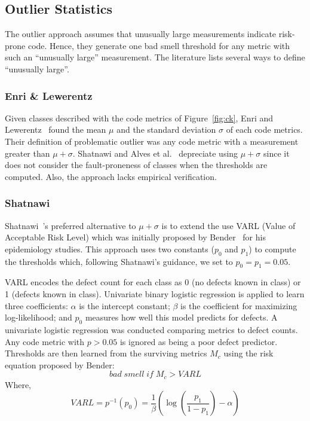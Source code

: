 \documentclass[twocolumn,5p]{elsarticle}
\newcommand{\fig}[1]{Figure~\ref{fig:#1}}
\theoremstyle{break}
\begin{document}
	\subsection{Outlier Statistics}
	
	The outlier approach assumes that unusually large measurements indicate 
	risk-prone code.
	Hence, they generate one bad smell threshold for any metric
	with such an ``unusually large'' measurement.
	The literature lists several ways to define ``unusually large''.
	
	
	
	
	\subsubsection{Enri \& Lewerentz}
	Given classes described with the  code metrics of \fig{ck},
	Enri and Lewerentz~\cite{erni96} found the   mean $\mu$ and the standard 
	deviation $\sigma$
	of each
	code metrics. Their definition of problematic outlier was any code
	metric with a measurement greater than $\mu+\sigma$.
	Shatnawi and Alves et al.~\cite{Shatnawi10,Alves2010} depreciate
	using $\mu+\sigma$ since it does not consider the fault-proneness of 
	classes when the thresholds are computed. Also, the approach lacks  
	empirical 
	verification.
	
	\subsubsection{ Shatnawi}\label{sect:shatnawi}
	Shatnawi~\cite{Shatnawi10}'s preferred alternative to $\mu+\sigma$
	is to extend the use VARL (Value of Acceptable Risk Level) which was 
	initially proposed by 
	Bender~\cite{bender99} for his epidemiology studies.  This approach uses two
	constants ($p_0$ and $p_1$) to compute the thresholds which, following 
	Shatnawi's guidance, we set to
	$p_0=p_1=0.05$.
	
	
	
	VARL encodes the defect count
	for each class as 0 (no defects known in class) or 1 (defects known in 
	class).
	Univariate binary logistic regression is applied to learn three 
	coefficients:
	$\alpha$ is the intercept constant;
	$\beta$ is the coefficient for maximizing log-likelihood;
	and $p_0$
	measures   how well this  model predicts for  defects. A univariate 
	logistic regression was conducted comparing metrics to defect counts. Any 
	code metric with $p>0.05$ is ignored as being a poor defect predictor. 
	Thresholds are then learned from the surviving metrics $M_c$ using
	the risk equation proposed by Bender:
	$$ \mathit{bad\; smell\; if\;} M_c > VARL$$
	Where,
	\begin{equation}
		VARL = p^{-1}(p_0) =  \frac{1}{\beta }\left( {\log \left( 
		{\frac{{{p_1}}}{{1 - {p_1}}}} \right) - \alpha } \right)
	\end{equation}
	
\end{document}
